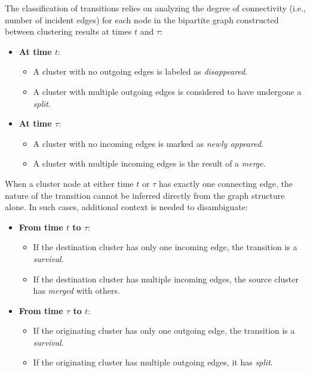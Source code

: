 

The classification of transitions relies on analyzing the degree of
connectivity (i.e., number of incident edges) for each node in the bipartite
graph constructed between clustering results at times $t$ and $\tau$:

\begin{itemize}
      \item \textbf{At time $t$}:
            \begin{itemize}
                  \item A cluster with no outgoing edges is labeled as \emph{disappeared}.
                  \item A cluster with multiple outgoing edges is considered to have undergone a
                        \emph{split}.
            \end{itemize}

      \item \textbf{At time $\tau$}:
            \begin{itemize}
                  \item A cluster with no incoming edges is marked as \emph{newly appeared}.
                  \item A cluster with multiple incoming edges is the result of a \emph{merge}.
            \end{itemize}
\end{itemize}

When a cluster node at either time $t$ or $\tau$ has exactly one connecting
edge, the nature of the transition cannot be inferred directly from the graph
structure alone. In such cases, additional context is needed to disambiguate:

\begin{itemize}
      \item \textbf{From time $t$ to $\tau$}:
            \begin{itemize}
                  \item If the destination cluster has only one incoming edge, the transition is a
                        \emph{survival}.
                  \item If the destination cluster has multiple incoming edges, the source cluster has
                        \emph{merged} with others.
            \end{itemize}

      \item \textbf{From time $\tau$ to $t$}:
            \begin{itemize}
                  \item If the originating cluster has only one outgoing edge, the transition is a
                        \emph{survival}.
                  \item If the originating cluster has multiple outgoing edges, it has \emph{split}.
            \end{itemize}
\end{itemize}


